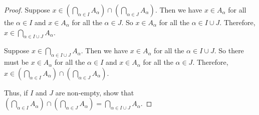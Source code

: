 \documentclass[12pt, letter]{article}
\begin{document}
\begin{enumerate}
\begin{proof}
        Suppose $x\in (\bigcap_{\alpha\in I}A_{\alpha})\cap(\bigcap_{\alpha\in J}A_{\alpha})$. Then we have $x\in A_\alpha$ for all the $\alpha\in I$ and $x\in A_\alpha$ for all the $\alpha\in J$. So $x\in A_\alpha$ for all the $\alpha\in I\cup J$. Therefore, $x\in\bigcap_{\alpha\in I\cup J}A_{\alpha}$. 

        Suppose $x\in \bigcap_{\alpha\in I\cup J}A_{\alpha}$. Then we have $x\in A_\alpha$ for all the $\alpha\in I\cup J$. So there must be $x\in A_\alpha$ for all the $\alpha\in I$ and $x\in A_\alpha$ for all the $\alpha\in J$. Therefore, $x\in(\bigcap_{\alpha\in I}A_{\alpha})\cap(\bigcap_{\alpha\in J}A_{\alpha})$.

        Thus, if $I$ and $J$ are non-empty, show that $(\bigcap_{\alpha\in I}A_{\alpha})\cap(\bigcap_{\alpha\in J}A_{\alpha})=\bigcap_{\alpha\in I\cup J}A_{\alpha}$.
    \end{proof}
\end{enumerate}
\end{document}
